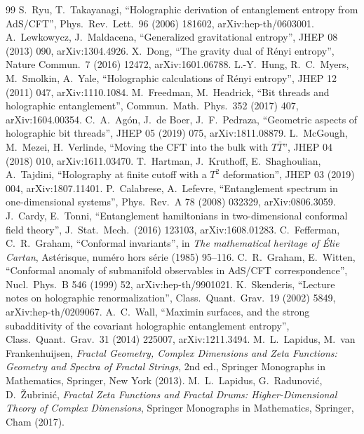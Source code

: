 \documentclass[11pt]{article}
\theoremstyle{definition}\newtheorem{definition}{Definition}[section]
\theoremstyle{remark}\newtheorem*{remark}{Remark}
\begin{document}
\begingroup\raggedright
\begin{thebibliography}{99}
 S.~Ryu, T.~Takayanagi, ``Holographic derivation of entanglement entropy from AdS/CFT'', Phys.\ Rev.\ Lett.\ 96 (2006) 181602, arXiv:hep-th/0603001.
 A.~Lewkowycz, J.~Maldacena, ``Generalized gravitational entropy'', JHEP 08 (2013) 090, arXiv:1304.4926.
 X.~Dong, ``The gravity dual of R\'enyi entropy'', Nature Commun.\ 7 (2016) 12472, arXiv:1601.06788.
 L.-Y.~Hung, R.~C.~Myers, M.~Smolkin, A.~Yale, ``Holographic calculations of R\'enyi entropy'', JHEP 12 (2011) 047, arXiv:1110.1084.
 M.~Freedman, M.~Headrick, ``Bit threads and holographic entanglement'', Commun.\ Math.\ Phys.\ 352 (2017) 407, arXiv:1604.00354.
 C.~A.~Ag\'on, J.~de Boer, J.~F.~Pedraza, ``Geometric aspects of holographic bit threads'', JHEP 05 (2019) 075, arXiv:1811.08879.
 L.~McGough, M.~Mezei, H.~Verlinde, ``Moving the CFT into the bulk with $T\bar T$'', JHEP 04 (2018) 010, arXiv:1611.03470.
 T.~Hartman, J.~Kruthoff, E.~Shaghoulian, A.~Tajdini, ``Holography at finite cutoff with a $T^2$ deformation'', JHEP 03 (2019) 004, arXiv:1807.11401.
 P.~Calabrese, A.~Lefevre, ``Entanglement spectrum in one-dimensional systems'', Phys.\ Rev.\ A 78 (2008) 032329, arXiv:0806.3059.
 J.~Cardy, E.~Tonni, ``Entanglement hamiltonians in two-dimensional conformal field theory'', J.\ Stat.\ Mech.\ (2016) 123103, arXiv:1608.01283.
 C.~Fefferman, C.~R.~Graham, ``Conformal invariants'', in \emph{The mathematical heritage of \'Elie Cartan}, Ast\'erisque, num\'ero hors s\'erie (1985) 95--116.
 C.~R.~Graham, E.~Witten, ``Conformal anomaly of submanifold observables in AdS/CFT correspondence'', Nucl.\ Phys.\ B 546 (1999) 52, arXiv:hep-th/9901021.
 K.~Skenderis, ``Lecture notes on holographic renormalization'', Class.\ Quant.\ Grav.\ 19 (2002) 5849, arXiv:hep-th/0209067.
 A.~C.~Wall, ``Maximin surfaces, and the strong subadditivity of the covariant holographic entanglement entropy'', Class.\ Quant.\ Grav.\ 31 (2014) 225007, arXiv:1211.3494.
 M.~L.~Lapidus, M.~van Frankenhuijsen, \emph{Fractal Geometry, Complex Dimensions and Zeta Functions: Geometry and Spectra of Fractal Strings}, 2nd ed., Springer Monographs in Mathematics, Springer, New York (2013).
 M.~L.~Lapidus, G.~Radunovi\'c, D.~\v{Z}ubrini\'c, \emph{Fractal Zeta Functions and Fractal Drums: Higher-Dimensional Theory of Complex Dimensions}, Springer Monographs in Mathematics, Springer, Cham (2017).

\end{thebibliography}
\end{document}
